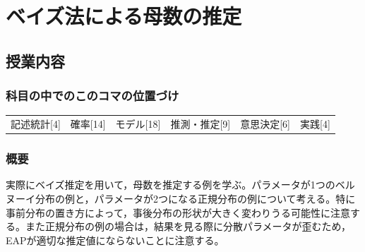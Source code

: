\section{ベイズ法による母数の推定}
\label{D1_lesson27}

\subsection{授業内容}
\subsubsection{科目の中でのこのコマの位置づけ}
\begin{tabular}[t]{cccccc}
    記述統計[4] & 確率[14] & モデル[18] & 推測・推定[9] & 意思決定[6] & 実践[4]
\end{tabular}

\subsubsection{概要}
実際にベイズ推定を用いて，母数を推定する例を学ぶ。パラメータが1つのベルヌーイ分布の例と，パラメータが2つになる正規分布の例について考える。特に事前分布の置き方によって，事後分布の形状が大きく変わりうる可能性に注意する。また正規分布の例の場合は，結果を見る際に分散パラメータが歪むため，EAPが適切な推定値にならないことに注意する。
